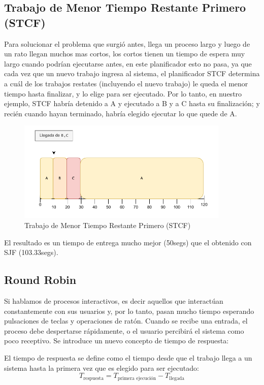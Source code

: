 \documentclass{article}
\begin{document}
\subsection{Trabajo de Menor Tiempo Restante Primero (STCF)}
Para solucionar el problema que surgió antes, llega un proceso largo y luego de un rato llegan muchos mas cortos, los cortos tienen un tiempo de espera muy largo cuando podrían ejecutarse antes, en este planificador esto no pasa, ya que cada vez que un nuevo trabajo ingresa al sistema, el planificador STCF determina a cuál de los trabajos restates (incluyendo el nuevo trabajo) le queda el menor tiempo hasta finalizar, y lo elige para ser ejecutado. Por lo tanto, en nuestro ejemplo, STCF habría detenido a A y ejecutado a B y a C hasta su finalización; y recién cuando hayan terminado, habría elegido ejecutar lo que quede de A. 

\begin{figure}[h]
    \centering
    \includegraphics[width=0.9\textwidth]{src/stcf.pdf}
    \caption{Trabajo de Menor Tiempo Restante Primero (STCF)}
\end{figure}

El resultado es un tiempo de entrega mucho mejor (50segs) que el obtenido con SJF (103.33segs). 

\subsection{Round Robin}
Si hablamos de procesos interactivos, es decir aquellos que interactúan constantemente con sus usuarios y, por lo tanto, pasan mucho tiempo esperando pulsaciones de teclas y operaciones de ratón. Cuando se recibe una entrada, el proceso debe despertarse rápidamente, o el usuario percibirá el sistema como poco receptivo. Se introduce un nuevo concepto de tiempo de respuesta:
\begin{definition}
    El tiempo de respuesta se define como el tiempo desde que el trabajo llega a un sistema hasta la primera vez que es elegido para ser ejecutado:
    \begin{equation*}
        T_{\text{respuesta}} = T_{\text{primera ejecución}} - T_{\text{llegada}}
    \end{equation*}
\end{definition}
\end{document}
